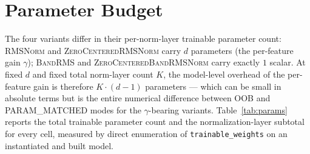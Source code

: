 \documentclass{article}
\newcommand{\rms}{\textsc{RMSNorm}}
\newcommand{\bandrms}{\textsc{BandRMS}}
\newcommand{\zcrms}{\textsc{ZeroCentered}\-\textsc{RMSNorm}}
\newcommand{\zcband}{\textsc{ZeroCentered}\-\textsc{BandRMSNorm}}
\begin{document}
\section{Parameter Budget}
\label{sec:params}

The four variants differ in their per-norm-layer trainable parameter count: \rms{} and \zcrms{} carry $d$ parameters (the per-feature gain $\gamma$); \bandrms{} and \zcband{} carry exactly $1$ scalar.
At fixed $d$ and fixed total norm-layer count $K$, the model-level overhead of the per-feature gain is therefore $K \cdot (d - 1)$ parameters --- which can be small in absolute terms but is the entire numerical difference between OOB and PARAM\_MATCHED modes for the $\gamma$-bearing variants.
Table~\ref{tab:params} reports the total trainable parameter count and the normalization-layer subtotal for every cell, measured by direct enumeration of \texttt{trainable\_weights} on an instantiated and built model.
\end{document}

